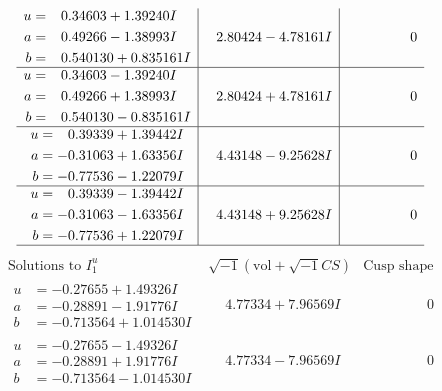 \documentclass[1p]{elsarticle_modified}
\theoremstyle{definition}
\newcommand{\I}{\sqrt{-1}}
\begin{document}
$$\begin{array}{c|c|c}
\begin{aligned}
u &= \phantom{-}0.34603 + 1.39240 I \\
a &= \phantom{-}0.49266 - 1.38993 I \\
b &= \phantom{-}0.540130 + 0.835161 I\end{aligned}
 & \phantom{-}2.80424 - 4.78161 I & \phantom{-0.000000 } 0 \\ \hline\begin{aligned}
u &= \phantom{-}0.34603 - 1.39240 I \\
a &= \phantom{-}0.49266 + 1.38993 I \\
b &= \phantom{-}0.540130 - 0.835161 I\end{aligned}
 & \phantom{-}2.80424 + 4.78161 I & \phantom{-0.000000 } 0 \\ \hline\begin{aligned}
u &= \phantom{-}0.39339 + 1.39442 I \\
a &= -0.31063 + 1.63356 I \\
b &= -0.77536 - 1.22079 I\end{aligned}
 & \phantom{-}4.43148 - 9.25628 I & \phantom{-0.000000 } 0 \\ \hline\begin{aligned}
u &= \phantom{-}0.39339 - 1.39442 I \\
a &= -0.31063 - 1.63356 I \\
b &= -0.77536 + 1.22079 I\end{aligned}
 & \phantom{-}4.43148 + 9.25628 I & \phantom{-0.000000 } 0\\
 \hline 
 \end{array}$$\newpage$$\begin{array}{c|c|c}  
\text{Solutions to }I^u_{1}& \I (\text{vol} + \sqrt{-1}CS) & \text{Cusp shape}\\
 \hline 
\begin{aligned}
u &= -0.27655 + 1.49326 I \\
a &= -0.28891 - 1.91776 I \\
b &= -0.713564 + 1.014530 I\end{aligned}
 & \phantom{-}4.77334 + 7.96569 I & \phantom{-0.000000 } 0 \\ \hline\begin{aligned}
u &= -0.27655 - 1.49326 I \\
a &= -0.28891 + 1.91776 I \\
b &= -0.713564 - 1.014530 I\end{aligned}
 & \phantom{-}4.77334 - 7.96569 I & \phantom{-0.000000 } 0 \\ \hline\begin{aligned}

\end{aligned}
\end{array}$$
\end{document}
